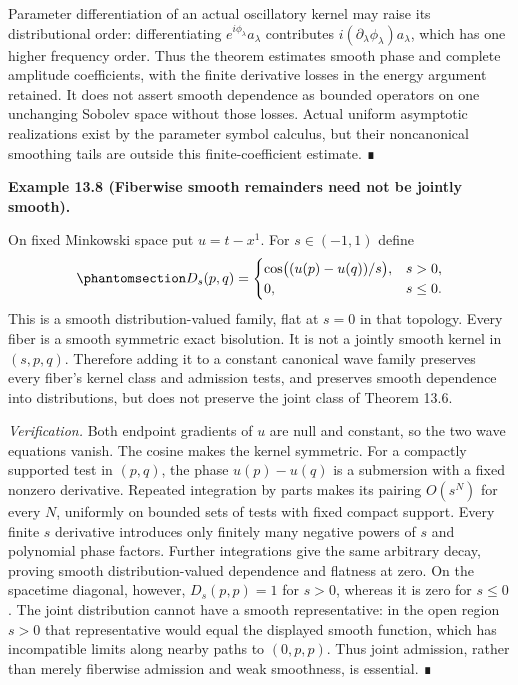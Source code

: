 \documentclass[
  english,
  11pt,
  reqno]{amsart}
\makeatletter
\newcommand{\pandocstatementheading}[1]{%
  \par\addpenalty{\@beginparpenalty}%
  \addvspace{.5\baselineskip plus .2\baselineskip minus .2\baselineskip}%
  {\normalfont\bfseries #1\par}%
  \nobreak\@afterindenttrue\@afterheading
}
\makeatother
\begin{document}
Parameter differentiation of an actual oscillatory kernel may raise its
distributional order: differentiating \(e^{i\phi_\lambda}a_\lambda\)
contributes \(i(\partial_\lambda\phi_\lambda)a_\lambda\), which has one
higher frequency order. Thus the theorem estimates smooth phase and
complete amplitude coefficients, with the finite derivative losses in
the energy argument retained. It does not assert smooth dependence as
bounded operators on one unchanging Sobolev space without those losses.
Actual uniform asymptotic realizations exist by the parameter symbol
calculus, but their noncanonical smoothing tails are outside this
finite-coefficient estimate. ∎

\pandocstatementheading{\protect{}\label{ex:weak-smooth-kernel-family}Example 13.8 (Fiberwise smooth remainders need not be jointly smooth).}

On fixed Minkowski space put \(u=t-x^1\). For \(s\in(-1,1)\) define
\begin{equation}\protect\phantomsection\label{eq:family-fiberwise-smooth-counterexample}{
D_s(p,q)=
\begin{cases}
\cos\bigl((u(p)-u(q))/s\bigr),&s>0,\\
0,&s\le0.
\end{cases}
}\end{equation} This is a smooth distribution-valued family, flat at
\(s=0\) in that topology. Every fiber is a smooth symmetric exact
bisolution. It is not a jointly smooth kernel in \((s,p,q)\). Therefore
adding it to a constant canonical wave family preserves every fiber's
kernel class and admission tests, and preserves smooth dependence into
distributions, but does not preserve the joint class of Theorem 13.6.

\emph{Verification.} Both endpoint gradients of \(u\) are null and
constant, so the two wave equations vanish. The cosine makes the kernel
symmetric. For a compactly supported test in \((p,q)\), the phase
\(u(p)-u(q)\) is a submersion with a fixed nonzero derivative. Repeated
integration by parts makes its pairing \(O(s^N)\) for every \(N\),
uniformly on bounded sets of tests with fixed compact support. Every
finite \(s\) derivative introduces only finitely many negative powers of
\(s\) and polynomial phase factors. Further integrations give the same
arbitrary decay, proving smooth distribution-valued dependence and
flatness at zero. On the spacetime diagonal, however, \(D_s(p,p)=1\) for
\(s>0\), whereas it is zero for \(s\le0\). The joint distribution cannot
have a smooth representative: in the open region \(s>0\) that
representative would equal the displayed smooth function, which has
incompatible limits along nearby paths to \((0,p,p)\). Thus joint
admission, rather than merely fiberwise admission and weak smoothness,
is essential. ∎
\end{document}
